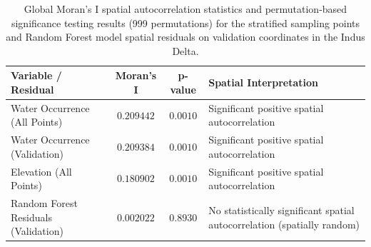 \begin{table}[t]
\caption{Global Moran's I spatial autocorrelation statistics and permutation-based significance testing results (999 permutations) for the stratified sampling points and Random Forest model spatial residuals on validation coordinates in the Indus Delta.}
\label{tab:spatial_autocorrelation}
\centering
\small
\begin{tabular}{p{4.2cm} c c p{6.5cm}}
\hline
\textbf{Variable / Residual} & \textbf{Moran's I} & \textbf{p-value} & \textbf{Spatial Interpretation} \\
\hline
Water Occurrence (All Points) & $0.209442$ & $0.0010$ & Significant positive spatial autocorrelation \\
Water Occurrence (Validation) & $0.209384$ & $0.0010$ & Significant positive spatial autocorrelation \\
Elevation (All Points) & $0.180902$ & $0.0010$ & Significant positive spatial autocorrelation \\
Random Forest Residuals (Validation) & $0.002022$ & $0.8930$ & No statistically significant spatial autocorrelation (spatially random) \\
\hline
\end{tabular}
\end{table}
